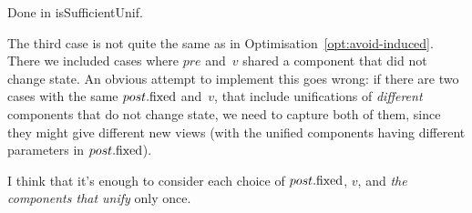 \begin{impNote}
Done in isSufficientUnif. 
\end{impNote}

\begin{improve}
The third case is not quite the same as in
Optimisation~\ref{opt:avoid-induced}.  There we included cases where $pre$
and~$v$ shared a component that did not change state.  An obvious attempt to
implement this goes wrong: if there are two cases with the same $post.\mathrm{fixed}$
and~$v$, that include unifications of \emph{different} components that do not
change state, we need to capture both of them, since they might give different
new views (with the unified components having different parameters in
$post.\mathrm{fixed}$).

I think that it's enough to consider each choice of $post.\mathrm{fixed}$, $v$, and
\emph{the components that unify} only once.
\end{improve}

 
